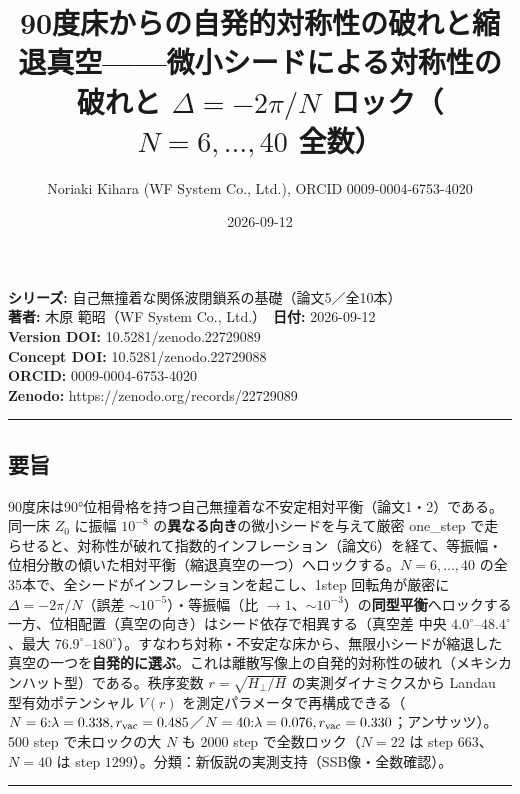 \documentclass[
  a4paper,
]{ltjsarticle}
\title{90度床からの自発的対称性の破れと縮退真空------微小シードによる対称性の破れと
\(\Delta=-2\pi/N\) ロック（\(N=6,\ldots,40\) 全数）}
\author{Noriaki Kihara (WF System Co., Ltd.), ORCID 0009-0004-6753-4020}
\date{2026-09-12}
\begin{document}
\maketitle

\textbf{シリーズ:} 自己無撞着な関係波閉鎖系の基礎（論文5／全10本）\\
\textbf{著者:} 木原 範昭（WF System Co., Ltd.）　\textbf{日付:}
2026-09-12\\
\textbf{Version DOI:} 10.5281/zenodo.22729089\\
\textbf{Concept DOI:} 10.5281/zenodo.22729088\\
\textbf{ORCID:} 0009-0004-6753-4020\\
\textbf{Zenodo:} https://zenodo.org/records/22729089\\

\begin{center}\rule{0.5\linewidth}{0.5pt}\end{center}

\subsection{要旨}\label{ux8981ux65e8}

90度床は90°位相骨格を持つ自己無撞着な不安定相対平衡（論文1・2）である。同一床
\(Z_0\) に振幅 \(10^{-8}\) の\textbf{異なる向き}の微小シードを与えて厳密
one\_step
で走らせると、対称性が破れて指数的インフレーション（論文6）を経て、等振幅・位相分散の傾いた相対平衡（縮退真空の一つ）へロックする。\(N=6,\ldots,40\)
の全35本で、全シードがインフレーションを起こし、1step 回転角が厳密に
\(\Delta=-2\pi/N\)（誤差 \(\sim10^{-5}\)）・等振幅（比
\(\to1\)、\(\sim10^{-3}\)）の\textbf{同型平衡}へロックする一方、位相配置（真空の向き）はシード依存で相異する（真空差
中央 \(4.0^\circ\)--\(48.4^\circ\)、最大
\(76.9^\circ\)--\(180^\circ\)）。すなわち対称・不安定な床から、無限小シードが縮退した真空の一つを\textbf{自発的に選ぶ}。これは離散写像上の自発的対称性の破れ（メキシカンハット型）である。秩序変数
\(r=\sqrt{H_\perp/H}\) の実測ダイナミクスから Landau 型有効ポテンシャル
\(V(r)\)
を測定パラメータで再構成できる（\(N=6{:}\lambda=0.338,r_{\rm vac}=0.485\)／\(N=40{:}\lambda=0.076,r_{\rm vac}=0.330\)；アンサッツ）。500
step で未ロックの大 \(N\) も 2000 step で全数ロック（\(N=22\) は step
\(663\)、\(N=40\) は step
\(1299\)）。分類：新仮説の実測支持（SSB像・全数確認）。

\begin{center}\rule{0.5\linewidth}{0.5pt}\end{center}
\end{document}
